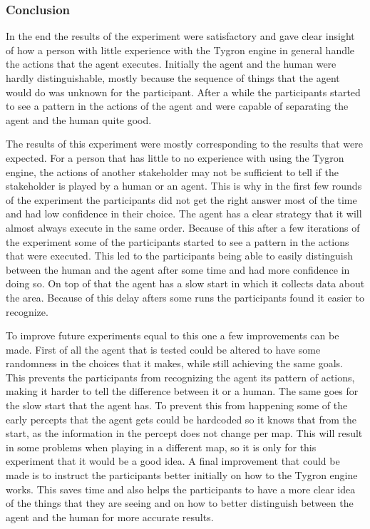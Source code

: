 \subsubsection{Conclusion}
In the end the results of the experiment were satisfactory and gave clear insight of how a person with little experience with the Tygron engine in general handle the actions that the agent executes. Initially the agent and the human were hardly distinguishable, mostly because the sequence of things that the agent would do was unknown for the participant. After a while the participants started to see a pattern in the actions of the agent and were capable of separating the agent and the human quite good.

The results of this experiment were mostly corresponding to the results that were expected. For a person that has little to no experience with using the Tygron engine, the actions of another stakeholder may not be sufficient to tell if the stakeholder is played by a human or an agent. This is why in the first few rounds of the experiment the participants did not get the right answer most of the time and had low confidence in their choice. 
 The agent has a clear strategy that it will almost always execute in the same order. Because of this after a few iterations of the experiment some of the participants started to see a pattern in the actions that were executed. This led to the participants being able to easily distinguish between the human and the agent after some time and had more confidence in doing so. On top of that the agent has a slow start in which it collects data about the area. Because of this delay afters some runs the participants found it easier to recognize. 

To improve future experiments equal to this one a few improvements can be made. First of all the agent that is tested could be altered to have some randomness in the choices that it makes, while still achieving the same goals. This prevents the participants from recognizing the agent its pattern of actions, making it harder to tell the difference between it or a human. The same goes for the slow start that the agent has. To prevent this from happening some of the early percepts that the agent gets could be hardcoded so it knows that from the start, as the information in the percept does not change per map. This will result in some problems when playing in a different map, so it is only for this experiment that it would be a good idea. A final improvement that could be made is to instruct the participants better initially on how to the Tygron engine works. This saves time and also helps the participants to have a more clear idea of the things that they are seeing and on how to better distinguish between the agent and the human for more accurate results.


